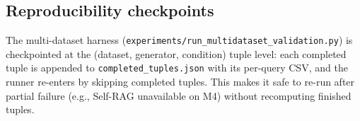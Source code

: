 \subsection{Reproducibility checkpoints}

The multi-dataset harness (\texttt{experiments/run\_multidataset\_validation.py})
is checkpointed at the (dataset, generator, condition) tuple level: each
completed tuple is appended to \texttt{completed\_tuples.json} with its
per-query CSV, and the runner re-enters by skipping completed tuples.
This makes it safe to re-run after partial failure (e.g., Self-RAG
unavailable on M4) without recomputing finished tuples.
